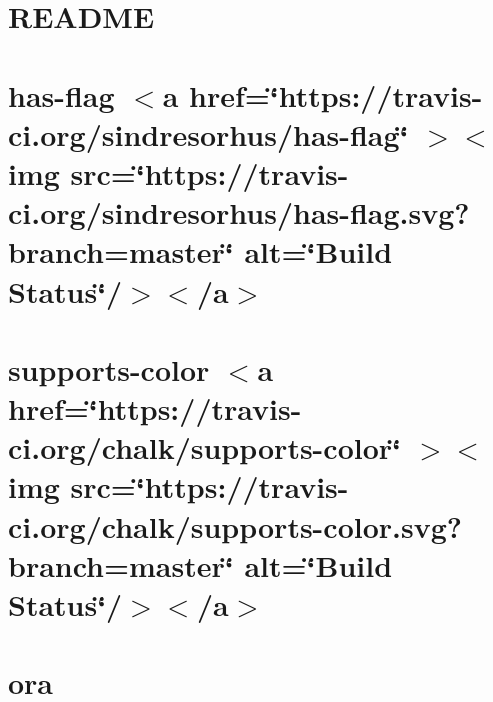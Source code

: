 \documentclass[twoside]{book}
\newcommand{\+}{\discretionary{\mbox{\scriptsize$\hookleftarrow$}}{}{}}
\begin{document}
\chapter{README}
\label{md__c___users_vaishnavi_jadhav__desktop__developer_code_mean_stack_example_client_node_modules_o013d24dc357bc5e9d55b4b7ef4e7350f}

\chapter{has-\/flag \texorpdfstring{$<$}{<}a href=\char`\"{}https\+://travis-\/ci.\+org/sindresorhus/has-\/flag\char`\"{} \texorpdfstring{$>$}{>}\texorpdfstring{$<$}{<}img src=\char`\"{}https\+://travis-\/ci.\+org/sindresorhus/has-\/flag.\+svg?branch=master\char`\"{} alt=\char`\"{}\+Build Status\char`\"{}/\texorpdfstring{$>$}{>}\texorpdfstring{$<$}{<}/a\texorpdfstring{$>$}{>}}
\label{md__c___users_vaishnavi_jadhav__desktop__developer_code_mean_stack_example_client_node_modules_ora_node_modules_has_flag_readme}

\chapter{supports-\/color \texorpdfstring{$<$}{<}a href=\char`\"{}https\+://travis-\/ci.\+org/chalk/supports-\/color\char`\"{} \texorpdfstring{$>$}{>}\texorpdfstring{$<$}{<}img src=\char`\"{}https\+://travis-\/ci.\+org/chalk/supports-\/color.\+svg?branch=master\char`\"{} alt=\char`\"{}\+Build Status\char`\"{}/\texorpdfstring{$>$}{>}\texorpdfstring{$<$}{<}/a\texorpdfstring{$>$}{>}}
\label{md__c___users_vaishnavi_jadhav__desktop__developer_code_mean_stack_example_client_node_modules_oa95419d372fc2b9b2d94a4fc183404f0}

\chapter{ora}
\label{md__c___users_vaishnavi_jadhav__desktop__developer_code_mean_stack_example_client_node_modules_ora_readme}

\end{document}
